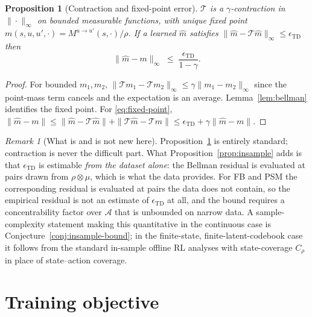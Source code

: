 \documentclass[11pt]{article}
\theoremstyle{plain}
\newtheorem{proposition}[lemma]{Proposition}
\theoremstyle{definition}
\theoremstyle{remark}
\newtheorem{remark}[lemma]{Remark}
\newcommand{\Aspace}{\mathcal A}
\newcommand{\1}{\mathbf 1}
\begin{document}
\begin{proposition}[Contraction and fixed-point error]
\label{prop:contraction}
$\mathcal T$ is a $\gamma$-contraction in $\|\cdot\|_\infty$ on bounded measurable
functions, with unique fixed point $m(s,u,u',\cdot)=M^{u\to u'}(s,\cdot)/\rho$. If a
learned $\hat m$ satisfies $\|\hat m-\mathcal T\hat m\|_\infty\le\epsilon_{\mathrm{TD}}$
then
\begin{equation}
\label{eq:fixed-point}
  \|\hat m-m\|_\infty\;\le\;\frac{\epsilon_{\mathrm{TD}}}{1-\gamma}.
\end{equation}
\end{proposition}

\begin{proof}
For bounded $m_1,m_2$, $\|\mathcal Tm_1-\mathcal Tm_2\|_\infty\le\gamma\|m_1-m_2\|_\infty$
since the point-mass term cancels and the expectation is an average. Lemma~\ref{lem:bellman}
identifies the fixed point. For \eqref{eq:fixed-point},
$\|\hat m-m\|\le\|\hat m-\mathcal T\hat m\|+\|\mathcal T\hat m-\mathcal Tm\|
\le\epsilon_{\mathrm{TD}}+\gamma\|\hat m-m\|$.
\end{proof}

\begin{remark}[What is and is not new here]
\label{rem:contraction-novelty}
Proposition~\ref{prop:contraction} is entirely standard; contraction is never the difficult
part. What Proposition~\ref{prop:insample} adds is that $\epsilon_{\mathrm{TD}}$ is
estimable \emph{from the dataset alone}: the Bellman residual is evaluated at pairs drawn
from $\rho\otimes\mu$, which is what the data provides. For FB and PSM the corresponding
residual is evaluated at pairs the data does not contain, so the empirical residual is not
an estimate of $\epsilon_{\mathrm{TD}}$ at all, and the bound requires a concentrability
factor over $\Aspace$ that is unbounded on narrow data. A sample-complexity statement
making this quantitative in the continuous case is Conjecture~\ref{conj:insample-bound};
in the finite-state, finite-latent-codebook case it follows from the standard in-sample
offline RL analyses with state-coverage $C_\rho$ in place of state--action coverage.
\end{remark}

\section{Training objective}
\label{sec:losses}
\end{document}
